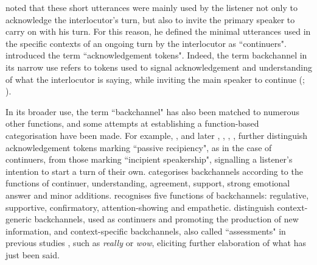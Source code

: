 \citet{Schegloff1982} noted that these short utterances were mainly used by the listener not only to acknowledge the interlocutor’s turn, but also to invite the primary speaker to carry on with his turn. For this reason, he defined the minimal utterances used in the specific contexts of an ongoing turn by the interlocutor as ``continuers". \citet{Jefferson1983} introduced the term ``acknowledgement tokens". Indeed, the term backchannel in its narrow use refers to tokens used to signal acknowledgement and understanding of what the interlocutor is saying, while inviting the main speaker to continue (\citealt{GravanoHirschberg2007}; \citealt{Hasegawa2014}).

In its broader use, the term ``backchannel" has also been matched to numerous other functions, and some attempts at establishing a function-based categorisation have been made. For example, \citet{Jefferson1983}, \citet{DrummondHopper1993} and later \citet{JurafskyEtAl1998}, \citet{Savino2010}, \citet{Savino2011}, \citet{Savino2014}, \citet{SavinoRefice2013} further distinguish acknowledgement tokens marking ``passive recipiency", as in the case of continuers, from those marking ``incipient speakership", signalling a listener’s intention to start a turn of their own. \citet{Senk1997} categorises backchannels according to the functions of continuer, understanding, agreement, support, strong emotional answer and minor additions. \citet{Kjellmer2009} recognises five functions of backchannels: regulative, supportive, confirmatory, attention-showing and empathetic. \citet{Tree2014} distinguish context-generic backchannels, used as continuers and promoting the production of new information, and context-specific backchannels, also called ``assessments" in previous studies \citep{Goodwin1986}, such as \textit{really} or \textit{wow}, eliciting further elaboration of what has just been said.

